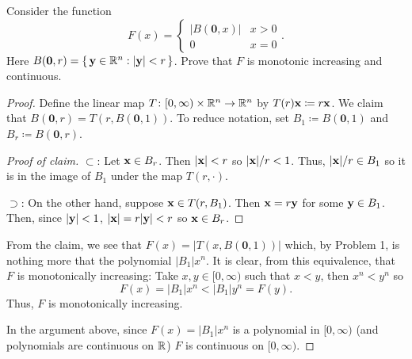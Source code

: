 \begin{problem}
Consider the function
\[
F(x)=
\begin{cases}
|B(\mathbf{0},x)|&x>0\\
0&x=0
\end{cases}.
\]
Here
$B(\mathbf{0},r)=\left\{\,\mathbf{y}\in\mathbb{R}^n:|\mathbf{y}|<r\,\right\}$. Prove
that $F$ is monotonic increasing and continuous.
\end{problem}
\begin{proof}
Define the linear map $T\colon[0,\infty)\times\mathbb{R}^n\to\mathbb{R}^n$ by
$T(r)\mathbf{x}\coloneq r\mathbf{x}$. We claim that
$B(\mathbf{0},r)=T(r,B(\mathbf{0},1))$. To reduce notation, set
$B_1\coloneq B(\mathbf{0},1)$ and $B_r\coloneq B(\mathbf{0},r)$.
\begin{proof}[Proof of claim]
\renewcommand{\qedsymbol}{$\clubsuit$}
$\subset$: Let $\mathbf{x}\in B_r$. Then $|\mathbf{x}|<r$ so $|\mathbf{x}|/r<1$. Thus,
$|\mathbf{x}|/r\in B_1$ so it is in the image of $B_1$ under the map
$T(r,\cdot)$.

$\supset$: On the other hand, suppose $\mathbf{x}\in T(r,B_1)$. Then
$\mathbf{x}=r\mathbf{y}$ for some $\mathbf{y}\in B_1$. Then, since $|\mathbf{y}|<1$,
$|\mathbf{x}|=r|\mathbf{y}|<r$ so $\mathbf{x}\in B_r$.
\end{proof}

From the claim, we see that $F(x)=|T(x,B(\mathbf{0},1))|$ which, by Problem
1, is nothing more that the polynomial $|B_1|x^n$. It is clear,
from this equivalence, that $F$ is monotonically increasing: Take
$x,y\in[0,\infty)$ such that $x<y$, then $x^n<y^n$ so
\begin{equation}
\label{eq:prep:1:7}
F(x)=|B_1|x^n<|B_1|y^n=F(y).
\end{equation}
Thus, $F$ is monotonically increasing.

In the argument above, since $F(x)=|B_1|x^n$ is a polynomial in
$[0,\infty)$ (and polynomials are continuous on $\mathbb{R}$) $F$ is continuous
on $[0,\infty)$.
\end{proof}

